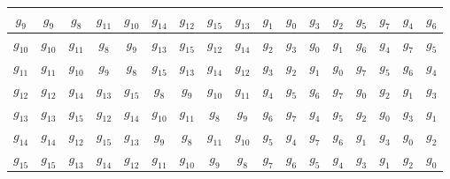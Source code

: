 \documentclass[letterpaper,11pt]{article}
\begin{document}
\begin{enumerate}
\begin{table}[h]
\begin{center}
\begin{tabular}{|c|c|c|c|c|c|c|c|c|c|c|c|c|c|c|c|c|}
    $g_{9}$ & $g_{9}$ & $g_{8}$ & $g_{11}$ & $g_{10}$ & $g_{14}$ & $g_{12}$ &  
    $g_{15}$ & $g_{13}$ & $g_{1}$ & $g_{0}$ & $g_{3}$ & $g_{2}$ & $g_{5}$ & 
    $g_{7}$ & $g_{4}$ & $g_{6}$ \\ \hline
    $g_{10}$ & $g_{10}$ & $g_{11}$ & $g_{8}$ & $g_{9}$ & $g_{13}$ & $g_{15}$ &  
    $g_{12}$ & $g_{14}$ & $g_{2}$ & $g_{3}$ & $g_{0}$ & $g_{1}$ & $g_{6}$ & 
    $g_{4}$ & $g_{7}$ & $g_{5}$ \\ \hline
    $g_{11}$ & $g_{11}$ & $g_{10}$ & $g_{9}$ & $g_{8}$ & $g_{15}$ & $g_{13}$ &  
    $g_{14}$ & $g_{12}$ & $g_{3}$ & $g_{2}$ & $g_{1}$ & $g_{0}$ & $g_{7}$ &
    $g_{5}$ & $g_{6}$ & $g_{4}$ \\ \hline
    $g_{12}$ & $g_{12}$ & $g_{14}$ & $g_{13}$ & $g_{15}$ & $g_{8}$ & $g_{9}$ &  
    $g_{10}$ & $g_{11}$ & $g_{4}$ & $g_{5}$ & $g_{6}$ & $g_{7}$ & $g_{0}$ & 
    $g_{2}$ & $g_{1}$ & $g_{3}$ \\ \hline
    $g_{13}$ & $g_{13}$ & $g_{15}$ & $g_{12}$ & $g_{14}$ & $g_{10}$ & $g_{11}$&
    $g_{8}$ & $g_{9}$ & $g_{6}$ & $g_{7}$ & $g_{4}$ & $g_{5}$ & $g_{2}$ &
    $g_{0}$ & $g_{3}$ & $g_{1}$ \\ \hline
    $g_{14}$ & $g_{14}$ & $g_{12}$ & $g_{15}$ & $g_{13}$ & $g_{9}$ & $g_{8}$ &  
    $g_{11}$ & $g_{10}$ & $g_{5}$ & $g_{4}$ & $g_{7}$ & $g_{6}$ & $g_{1}$ &  
    $g_{3}$ & $g_{0}$ & $g_{2}$ \\ \hline
    $g_{15}$ & $g_{15}$ & $g_{13}$ & $g_{14}$ & $g_{12}$ & $g_{11}$ & $g_{10}$&
    $g_{9}$ & $g_{8}$ & $g_{7}$ & $g_{6}$ & $g_{5}$ & $g_{4}$ & $g_{3}$ & 
    $g_{1}$ & $g_{2}$ & $g_{0}$\\ \hline
    \end{tabular}
    \end{center}
    \end{table}
    

\end{enumerate}
\end{document}
